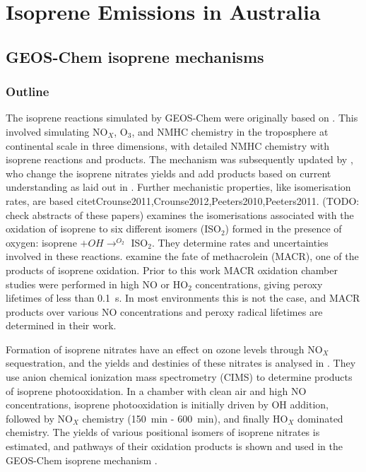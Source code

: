 
\chapter{Isoprene Emissions in Australia} %
\label{ch_isop}

\section{GEOS-Chem isoprene mechanisms}
\label{ch_isop:sec:GEOSChemMechanisms}
  \subsection{Outline}
    The isoprene reactions simulated by GEOS-Chem were originally based on \cite{Horowitz1998}.
    This involved simulating NO$_X$, O$_3$, and NMHC chemistry in the troposphere at continental scale in three dimensions, with detailed NMHC chemistry with isoprene reactions and products.
    The mechanism was subsequently updated by \citet{Mao2013}, who change the isoprene nitrates yields and add products based on current understanding as laid out in \citet{Paulot2009a,Paulot2009b}.
    Further mechanistic properties, like isomerisation rates, are based citet{Crounse2011,Crounse2012,Peeters2010,Peeters2011}.
    (TODO: check abstracts of these papers)
    \cite{Crounse2011} examines the isomerisations associated with the oxidation of isoprene to six different isomers (ISO$_2$) formed in the presence of oxygen: isoprene $ + OH \rightarrow^{O_2} $ ISO$_2$.
    They determine rates and uncertainties involved in these reactions.
    \cite{Crounse2012} examine the fate of methacrolein (MACR), one of the products of isoprene oxidation. 
    Prior to this work MACR oxidation chamber studies were performed in high NO or HO$_2$ concentrations, giving peroxy lifetimes of less than 0.1~s.
    In most environments this is not the case, and MACR products over various NO concentrations and peroxy radical lifetimes are determined in their work.
    
    Formation of isoprene nitrates have an effect on ozone levels through NO$_X$ sequestration, and the yields and destinies of these nitrates is analysed in \citet{Paulot2009a}. 
    They use anion chemical ionization mass spectrometry (CIMS) to determine products of isoprene photooxidation.
    In a chamber with clean air and high NO concentrations, isoprene photooxidation is initially driven by OH addition, followed by NO$_X$ chemistry (150~min - 600~min), and finally HO$_X$ dominated chemistry.
    The yields of various positional isomers of isoprene nitrates is estimated, and pathways of their oxidation products is shown and used in the GEOS-Chem isoprene mechanism \citep{Paulot2009a,Mao2013}. 
    
